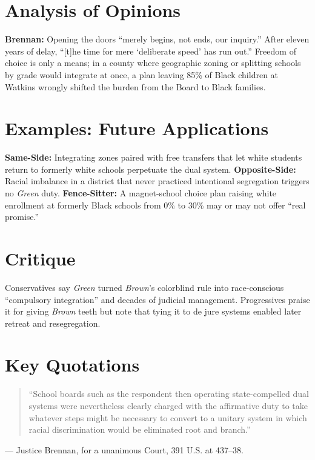 \documentclass[12pt]{article}
\begin{document}
\section{Analysis of Opinions}
\textbf{Brennan:} Opening the doors ``merely begins, not ends, our inquiry.'' After eleven years of delay, ``[t]he time for mere `deliberate speed' has run out.'' Freedom of choice is only a means; in a county where geographic zoning or splitting schools by grade would integrate at once, a plan leaving 85\% of Black children at Watkins wrongly shifted the burden from the Board to Black families.

\section{Examples: Future Applications}
\textbf{Same-Side:} Integrating zones paired with free transfers that let white students return to formerly white schools perpetuate the dual system. \textbf{Opposite-Side:} Racial imbalance in a district that never practiced intentional segregation triggers no \textit{Green} duty. \textbf{Fence-Sitter:} A magnet-school choice plan raising white enrollment at formerly Black schools from 0\% to 30\% may or may not offer ``real promise.''

\section{Critique}
Conservatives say \textit{Green} turned \textit{Brown}'s colorblind rule into race-conscious ``compulsory integration'' and decades of judicial management. Progressives praise it for giving \textit{Brown} teeth but note that tying it to de jure systems enabled later retreat and resegregation.

\section{Key Quotations}
\begin{quote}
``School boards such as the respondent then operating state-compelled dual systems were nevertheless clearly charged with the affirmative duty to take whatever steps might be necessary to convert to a unitary system in which racial discrimination would be eliminated root and branch.''
\end{quote}
\noindent --- Justice Brennan, for a unanimous Court, 391 U.S. at 437--38.
\end{document}
